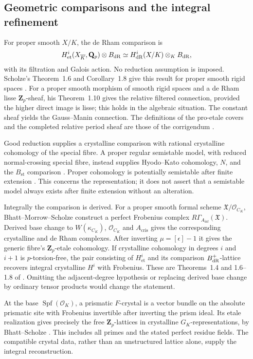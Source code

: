 \documentclass[11pt]{article}
\theoremstyle{definition}\newtheorem{definition}[theorem]{Definition}
\theoremstyle{remark}\newtheorem{remark}[theorem]{Remark}
\newcommand{\Q}{\mathbf Q}\newcommand{\Z}{\mathbf Z}
\begin{document}
\subsection{Geometric comparisons and the integral refinement}
For proper smooth $X/K$, the de Rham comparison is
\[
 H^i_{\mathrm{et}}(X_{\overline K},\Q_p)\otimes B_{\dR}
       \simeq H^i_{\dR}(X/K)\otimes_KB_{\dR},
\]
with its filtration and Galois action. No reduction assumption is imposed. Scholze's Theorem~1.6 and Corollary~1.8 give this result for proper smooth rigid spaces \cite[pp.~4--5]{ScholzeLocal}. For a proper smooth morphism of smooth rigid spaces and a de Rham lisse $\Z_p$-sheaf, his Theorem~1.10 gives the relative filtered connection, provided the higher direct image is lisse; this holds in the algebraic situation. The constant sheaf yields the Gauss--Manin connection. The definitions of the pro-etale covers and the completed relative period sheaf are those of the corrigendum \cite{ScholzeErratumLocal}.

Good reduction supplies a crystalline comparison with rational crystalline cohomology of the special fibre. A proper regular semistable model, with reduced normal-crossing special fibre, instead supplies Hyodo--Kato cohomology, $N$, and the $B_{\mathrm{st}}$ comparison \cite[Theorem~1.1, pp.~323--324]{TsujiLocal}. Proper cohomology is potentially semistable after finite extension \cite[Corollary~2.2.3, p.~209]{TsujiICMLocal}. This concerns the representation; it does not assert that a semistable model always exists after finite extension without an alteration.

Integrally the comparison is derived. For a proper smooth formal scheme $\mathfrak X/\mathcal O_{C_K}$, Bhatt--Morrow--Scholze construct a perfect Frobenius complex $R\Gamma_{A_{\inf}}(\mathfrak X)$. Derived base change to $W(\kappa_{C_K})$, $\mathcal O_{C_K}$ and $A_{\mathrm{cris}}$ gives the corresponding crystalline and de Rham complexes. After inverting $\mu=[\epsilon]-1$ it gives the generic fibre's $\Z_p$-etale cohomology. If crystalline cohomology in degrees $i$ and $i+1$ is $p$-torsion-free, the pair consisting of $H^i_{\mathrm{et}}$ and its comparison $B_{\mathrm{dR}}^+$-lattice recovers integral crystalline $H^i$ with Frobenius. These are Theorems~1.4 and 1.6--1.8 of \cite[pp.~4--6]{BMSLocal}. Omitting the adjacent-degree hypothesis or replacing derived base change by ordinary tensor products would change the statement.

At the base $\operatorname{Spf}(\mathcal O_K)$, a prismatic $F$-crystal is a vector bundle on the absolute prismatic site with Frobenius invertible after inverting the prism ideal. Its etale realization gives precisely the free $\Z_p$-lattices in crystalline $G_K$-representations, by Bhatt--Scholze \cite[Definition~1.1 and Theorem~1.2, p.~2]{PrismaticCrystalsLocal}. This includes all primes and the stated perfect residue fields. The compatible crystal data, rather than an unstructured lattice alone, supply the integral reconstruction.
\end{document}
